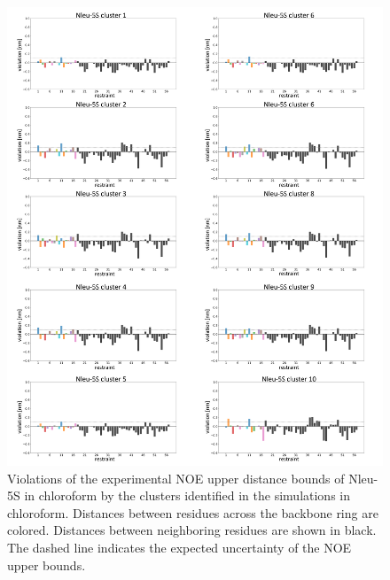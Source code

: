 \begin{figure}[h!]
    \centering
    \includegraphics[width=\textwidth]{7_chapter_5/fig/results/NMR_5S.png}
    \caption{ Violations  of  the  experimental  NOE  upper  distance  bounds  of  Nleu-5S  in chloroform by the clusters identified in the simulations in chloroform. Distances between residues across the backbone ring are colored. Distances between neighboring residues are shown in black. The dashed line indicates the expected uncertainty of the NOE upper bounds.}
    \label{fig: SINOE violations Nleu-5S}
\end{figure}

